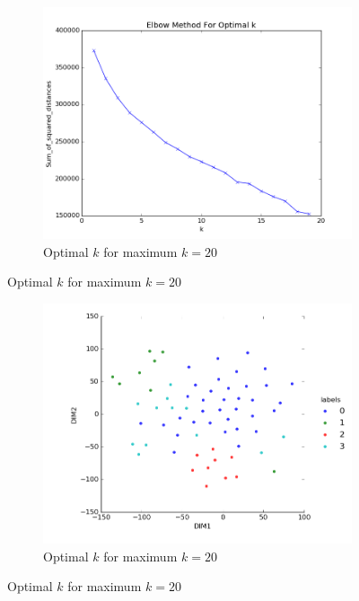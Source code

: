 \documentclass[20pt]{article} %
\begin{document}
\begin{figure}[!htbp]
	\centering
   	\begin{subfigure}[!htbp]{0.7\linewidth}
    	\includegraphics[width=\linewidth]{./figures/kmax20.png}
	\caption{Optimal $k$ for maximum $k=20$}
   	\end{subfigure}
\end{figure} 
\begin{figure}[!htbp]
	\centering
   	\begin{subfigure}[!htbp]{0.7\linewidth}
    	\includegraphics[width=\linewidth]{./figures/plot1.png}
	\caption{Optimal $k$ for maximum $k=20$}
   	\end{subfigure}
\end{figure} 
\end{document}
